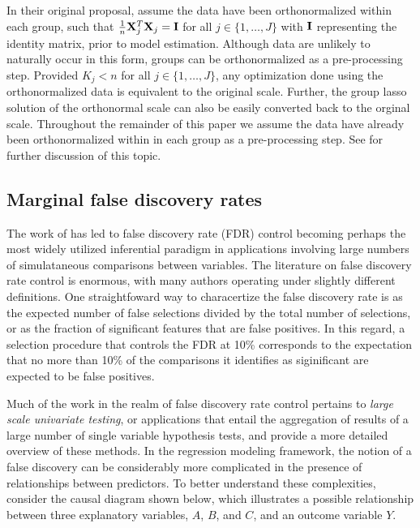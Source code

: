 In their original proposal, \citet{Yuan2006} assume the data have been orthonormalized within each group, such that $\tfrac{1}{n}\mathbf{X}_j^T\mathbf{X}_j = \mathbf{I}$ for all $j \in \{1, \ldots, J\}$ with $\mathbf{I}$ representing the identity matrix, prior to model estimation.  Although data are unlikely to naturally occur in this form, groups can be orthonormalized as a pre-processing step.  Provided $K_j < n$ for all $j \in \{1, \ldots, J\}$, any optimization done using the orthonormalized data is equivalent to the original scale.  Further, the group lasso solution of the orthonormal scale can also be easily converted back to the orginal scale.  Throughout the remainder of this paper we assume the data have already been orthonormalized within in each group as a pre-processing step. See \citet{Simon2012} for further discussion of this topic.


\subsection{Marginal false discovery rates}

The work of \citet{BH_1995} has led to false discovery rate (FDR) control becoming perhaps the most widely utilized inferential paradigm in applications involving large numbers of simulataneous comparisons between variables.  The literature on false discovery rate control is enormous, with many authors operating under slightly different definitions.  One straightfoward way to characertize the false discovery rate is as the expected number of false selections divided by the total number of selections, or as the fraction of significant features that are false positives.  In this regard, a selection procedure that controls the FDR at 10\% corresponds to the expectation that no more than 10\% of the comparisons it identifies as siginificant are expected to be false positives.  

Much of the work in the realm of false discovery rate control pertains to \textit{large scale univariate testing}, or applications that entail the aggregation of results of a large number of single variable hypothesis tests, \citet{Farcomeni2008} and \citet{Strimmer2008} provide a more detailed overview of these methods.  In the regression modeling framework, the notion of a false discovery can be considerably more complicated in the presence of relationships between predictors.  To better understand these complexities, consider the causal diagram shown below, which illustrates a possible relationship between three explanatory variables, $A$, $B$, and $C$, and an outcome variable $Y$.

